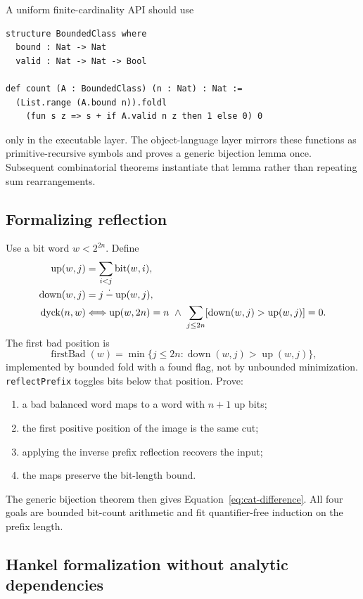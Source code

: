 A uniform finite-cardinality API should use
\begin{lstlisting}[language={}]
structure BoundedClass where
  bound : Nat -> Nat
  valid : Nat -> Nat -> Bool

def count (A : BoundedClass) (n : Nat) : Nat :=
  (List.range (A.bound n)).foldl
    (fun s z => s + if A.valid n z then 1 else 0) 0
\end{lstlisting}
only in the executable layer.  The object-language layer mirrors these
functions as primitive-recursive symbols and proves a generic bijection lemma
once.  Subsequent combinatorial theorems instantiate that lemma rather than
repeating sum rearrangements.

\subsection{Formalizing reflection}

Use a bit word $w<2^{2n}$.  Define
\begin{align*}
 \operatorname{up}(w,j)&=\sum_{i<j}\operatorname{bit}(w,i),\\
 \operatorname{down}(w,j)&=j\mathbin{\mathop{\dot{-}}}\operatorname{up}(w,j),\\
 \operatorname{dyck}(n,w)&\Longleftrightarrow
   \operatorname{up}(w,2n)=n\ \wedge\
   \sum_{j\le2n}[\operatorname{down}(w,j)>
                         \operatorname{up}(w,j)]=0.
\end{align*}
The first bad position is
\[
 \operatorname{firstBad}(w)=
 \min\{j\le2n:\operatorname{down}(w,j)>
                    \operatorname{up}(w,j)\},
\]
implemented by bounded fold with a found flag, not by unbounded minimization.
\texttt{reflectPrefix} toggles bits below that position.  Prove:
\begin{enumerate}[label=(\roman*),leftmargin=2em]
\item a bad balanced word maps to a word with $n+1$ up bits;
\item the first positive position of the image is the same cut;
\item applying the inverse prefix reflection recovers the input;
\item the maps preserve the bit-length bound.
\end{enumerate}
The generic bijection theorem then gives Equation~\eqref{eq:cat-difference}.
All four goals are bounded bit-count arithmetic and fit quantifier-free
induction on the prefix length.

\subsection{Hankel formalization without analytic dependencies}

